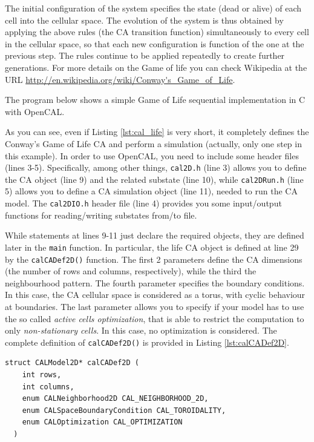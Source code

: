 The initial configuration of the system specifies the state (dead or
alive) of each cell into the cellular space. The evolution of the
system is thus obtained by applying the above rules (the CA transition
function) simultaneously to every cell in the cellular space, so that
each new configuration is function of the one at the previous
step. The rules continue to be applied repeatedly to create further
generations. For more details on the Game of life you can check
Wikipedia at the URL
\url{http://en.wikipedia.org/wiki/Conway's_Game_of_Life}.

The program below shows a simple Game of Life sequential
implementation in C with OpenCAL.



As you can see, even if Listing \ref{lst:cal_life} is very short, it
completely defines the Conway's Game of Life CA and perform a
simulation (actually, only one step in this example). In order to use
OpenCAL, you need to include some header files (lines
3-5). Specifically, among other things, \verb'cal2D.h' (line 3) allows
you to define the CA object (line 9) and the related substate (line
10), while \verb'cal2DRun.h' (line 5) allows you to define a CA
simulation object (line 11), needed to run the CA model. The
\verb'cal2DIO.h' header file (line 4) provides you some input/output
functions for reading/writing substates from/to file.

While statements at lines 9-11 just declare the required objects, they are
defined later in the \verb'main' function. In particular, the life CA
object is defined at line 29 by the \verb'calCADef2D()' function. The
first 2 parameters define the CA dimensions (the number of rows and
columns, respectively), while the third the neighbourhood pattern. The
fourth parameter specifies the boundary conditions. In this case, the CA
cellular space is considered as a torus, with cyclic behaviour at
boundaries. The last parameter allows you to specify if your model
has to use the so called \emph{active cells optimization}, that is
able to restrict the computation to only \emph{non-stationary cells}. In this
case, no optimization is considered.  The complete definition of
\verb'calCADef2D()' is provided in Listing \ref{lst:calCADef2D}.

\begin{lstlisting}[float,floatplacement=H, label=lst:calCADef2D, caption=Definition of the calCADef2D() function., numbers=none]
  struct CALModel2D* calCADef2D (
    int rows,
    int columns,
    enum CALNeighborhood2D CAL_NEIGHBORHOOD_2D,
    enum CALSpaceBoundaryCondition CAL_TOROIDALITY,
    enum CALOptimization CAL_OPTIMIZATION
  )
\end{lstlisting}  

